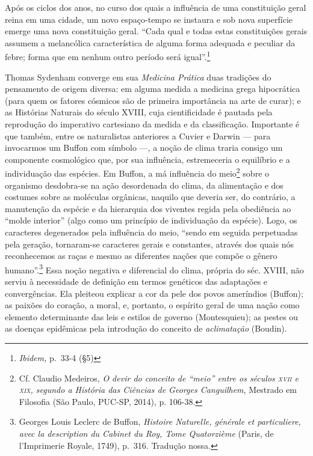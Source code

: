 Após os ciclos dos anos, no curso dos quais a influência de uma
constituição geral reina em uma cidade, um novo espaço-tempo se instaura
e sob nova superfície emerge uma nova constituição geral. ``Cada qual e
todas estas constituições gerais assumem a melancólica característica de
alguma forma adequada e peculiar da febre; forma que em nenhum outro
período será igual''.\footnote{\textit{Ibidem,} p.~33-4 (§5)}

Thomas Sydenham converge em sua \textit{Medicina Prática} duas tradições
do pensamento de origem diversa: em alguma medida a medicina grega
hipocrática (para quem os fatores cósmicos são de primeira importância
na arte de curar); e as Histórias Naturais do século XVIII, cuja
cientificidade é pautada pela reprodução do imperativo cartesiano da
medida e da classificação. Importante é que também, entre os
naturalistas anteriores a Cuvier e Darwin --- para invocarmos um Buffon
com símbolo ---, a noção de clima traria consigo um componente
cosmológico que, por sua influência, estremeceria o equilíbrio e a
individuação das espécies. Em Buffon, a má influência do meio\footnote{Cf.
  Claudio Medeiros, \textit{O devir do conceito de ``meio'' entre os
  séculos \textsc{xvii} e \textsc{xix}, segundo a História das Ciências de Georges
  Canguilhem}, Mestrado em Filosofia (São Paulo, PUC-SP, 2014), p.
  106-38.} sobre o organismo desdobra-se na ação desordenada do clima,
da alimentação e dos costumes sobre as moléculas orgânicas, naquilo que
deveria ser, do contrário, a manutenção da espécie e da hierarquia dos
viventes regida pela obediência ao ``molde interior'' (algo como um
princípio de individuação da espécie). Logo, os caracteres degenerados
pela influência do meio, ``sendo em seguida perpetuadas pela geração,
tornaram-se caracteres gerais e constantes, através dos quais nós
reconhecemos as raças e mesmo as diferentes nações que compõe o gênero
humano''.\footnote{Georges Louis Leclerc de Buffon, \textit{Histoire
  Naturelle, générale et particuliere, avec la description du Cabinet du
  Roy, Tome Quatorzième} (Paris, de l'Imprimerie Royale, 1749), p.~316.
  Tradução nossa.} Essa noção negativa e diferencial do clima, própria
do séc. XVIII, não serviu à necessidade de definição em termos genéticos
das adaptações e convergências. Ela pleiteou explicar a cor da pele dos
povos ameríndios (Buffon); as paixões do coração, a moral, e, portanto,
o espírito geral de uma nação como elemento determinante das leis e
estilos de governo (Montesquieu); as pestes ou as doenças epidêmicas
pela introdução do conceito de \textit{aclimatação} (Boudin).

